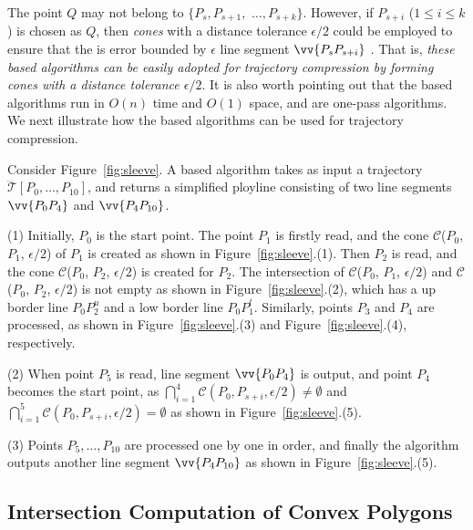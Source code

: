 The point $Q$ may not belong to $\{P_{s}, P_{s+1},$ $\ldots, P_{s+k}\}$.
However, if $P_{s+i}$ ($1\le i\le k$) is chosen as $Q$, then \emph{cones} with a distance tolerance $\epsilon/2$ could be employed to ensure that the \ped is error bounded by $\epsilon$ \wrt line segment $\vv{P_sP_{s+i}}$ \cite{Zhao:Sleeve}. That is, {\em these \cia based algorithms can be easily adopted for trajectory compression by forming cones with a distance tolerance $\epsilon/2$}.  It is also worth pointing out that the \cia based algorithms  run in $O(n)$ time and $O(1)$ space, and are one-pass algorithms.
%
We next illustrate how the \cia based algorithms can be used for trajectory compression.



\begin{example}
\label{exm-alg-sleeve}
Consider Figure~\ref{fig:sleeve}. A \cia based algorithm takes as input a trajectory $\dddot{\mathcal{T}}[P_0, \ldots, P_{10}]$, and returns a simplified ployline consisting of two line segments $\vv{P_0P_4}$ and  $\vv{P_4P_{10}}$.

\sstab(1) Initially, $P_0$ is the start point. The point $P_1$ is firstly read, and the cone $\mathcal{C}$($P_0$, $P_{1}$, $\epsilon/2$) of $P_1$ is created as shown in Figure~\ref{fig:sleeve}.(1).
Then $P_2$ is read, and the cone $\mathcal{C}$($P_0$, $P_{2}$, $\epsilon/2$) is created for $P_2$. The intersection of $\mathcal{C}$($P_0$, $P_{1}$, $\epsilon/2$) and $\mathcal{C}$($P_0$, $P_{2}$, $\epsilon/2$) is not empty as shown in Figure~\ref{fig:sleeve}.(2), which has a up border line $P_0P_2^u$ and a low border line $P_0P_1^l$.
%
Similarly, points $P_3$ and $P_4$ are processed, as shown in Figure~\ref{fig:sleeve}.(3) and Figure~\ref{fig:sleeve}.(4), respectively.

\sstab(2) When point $P_5$ is read,  line segment $\vv{P_0P_4}$ is output, and point $P_4$ becomes the start point, as $\bigcap_{i=1}^{4}\mathcal{C}(P_0, P_{s+i}, \epsilon/2) \ne \emptyset$ and $\bigcap_{i=1}^{5}\mathcal{C}(P_0, P_{s+i}, \epsilon/2) = \emptyset$ as shown in Figure~\ref{fig:sleeve}.(5).


\sstab(3) Points $P_5, \ldots, P_{10}$ are processed one by one in order, and finally the algorithm outputs another line segment $\vv{P_4P_{10}}$ as shown in Figure~\ref{fig:sleeve}.(5).
\end{example}




\subsection{\textcolor[rgb]{0.00,0.07,1.00}{Intersection Computation of Convex Polygons}}

